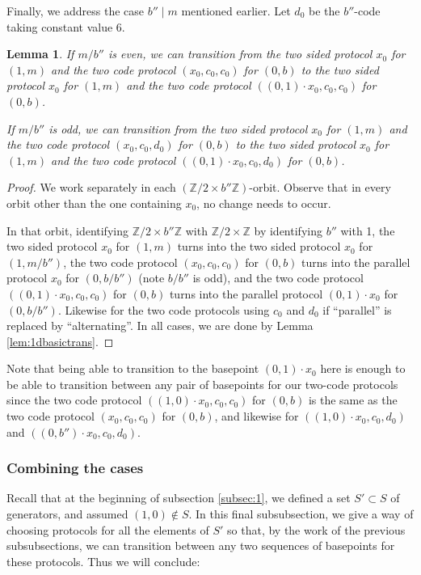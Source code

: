\documentclass[12pt]{article}
\newcommand{\0}{\varnothing}
\newcommand{\Z}{\mathbb{Z}}
\newtheorem{lemma}{Lemma}
\begin{document}
Finally, we address the case $b'' \mid m$ mentioned earlier. Let $d_0$ be the $b''$-code taking constant value 6.

\begin{lemma}\label{lem:specialeventrans}
If $m/b''$ is even, we can transition from the two sided protocol $x_0$ for $(1,m)$ and the two code protocol $(x_0,c_0,c_0)$ for $(0,b)$ to the two sided protocol $x_0$ for $(1,m)$ and the two code protocol $((0,1) \cdot x_0,c_0,c_0)$ for $(0,b)$.

If $m/b''$ is odd, we can transition from the two sided protocol $x_0$ for $(1,m)$ and the two code protocol $(x_0,c_0,d_0)$ for $(0,b)$ to the two sided protocol $x_0$ for $(1,m)$ and the two code protocol $((0,1) \cdot x_0,c_0,d_0)$ for $(0,b)$.
\end{lemma}

\begin{proof}
We work separately in each $(\Z/2 \times b''\Z)$-orbit. Observe that in every orbit other than the one containing $x_0$, no change needs to occur.

In that orbit, identifying $\Z/2 \times b''\Z$ with $\Z/2 \times \Z$ by identifying $b''$ with 1, the two sided protocol $x_0$ for $(1,m)$ turns into the two sided protocol $x_0$ for $(1,m/b'')$, the two code protocol $(x_0,c_0,c_0)$ for $(0,b)$ turns into the parallel protocol $x_0$ for $(0,b/b'')$ (note $b/b''$ is odd), and the two code protocol $((0,1) \cdot x_0,c_0,c_0)$ for $(0,b)$ turns into the parallel protocol $(0,1) \cdot x_0$ for $(0,b/b'')$. Likewise for the two code protocols using $c_0$ and $d_0$ if ``parallel'' is replaced by ``alternating''. In all cases, we are done by Lemma \ref{lem:1dbasictrans}.
\end{proof}

Note that being able to transition to the basepoint $(0,1) \cdot x_0$ here is enough to be able to transition between any pair of basepoints for our two-code protocols since the two code protocol $((1,0) \cdot x_0, c_0,c_0)$ for $(0,b)$ is the same as the two code protocol $(x_0,c_0,c_0)$ for $(0,b)$, and likewise for $((1,0) \cdot x_0,c_0,d_0)$ and $((0,b'') \cdot x_0,c_0,d_0)$.

\subsubsection{Combining the cases}

Recall that at the beginning of subsection \ref{subsec:1}, we defined a set $S' \subset S$ of generators, and assumed $(1,0) \not\in S$. In this final subsubsection, we give a way of choosing protocols for all the elements of $S'$ so that, by the work of the previous subsubsections, we can transition between any two sequences of basepoints for these protocols. Thus we will conclude:
\end{document}
